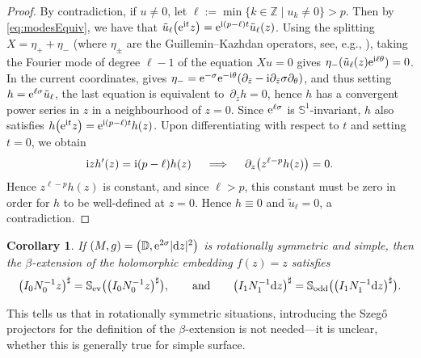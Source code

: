 \documentclass[10pt,a4paper]{amsart}
\numberwithin{equation}{section}
\newtheorem{Corollary}[Theorem]{Corollary}
\theoremstyle{definition}
\newcommand{\1}{{\bf 1}}
\newcommand \Dm { \mathbb{D}}
\newcommand \Sm { \mathbb{S}}
\newcommand \Zm { \mathbb{Z}}
\newcommand \zbar { \bar{z}}
\newcommand \tu {\tilde{u}}
\begin{document}
\begin{proof}By contradiction, if $u\ne 0$, let $\ell := \min\{k\in \Zm \mid u_k\ne 0\}>p$. Then by \eqref{eq:modesEquiv}, we have that $\tu_\ell \bigl({\rm e}^{{\rm i}t}z\bigr) = {\rm e}^{{\rm i}(p-\ell)t} \tu_\ell(z)$. {Using the splitting $X = \eta_+ + \eta_-$ (where $\eta_\pm$ are the Guillemin--Kazhdan operators, see, e.g., \cite[Definition~6.1.4]{PSU23}), taking the Fourier mode of degree $\ell-1$ of the equation $Xu =0$ gives $\eta_- (\tu_\ell (z) {\rm e}^{{\rm i}\ell \theta}) = 0$. In the current coordinates, \cite[Lemma~6.1.8]{PSU23} gives $\eta_- = {\rm e}^{-\sigma} {\rm e}^{-{\rm i}\theta} (\partial_{\bar{z}} - {\rm i}\partial_{\bar{z}}\sigma \partial_\theta)$, and thus setting $h = {\rm e}^{\ell\sigma} \tu_\ell$, the last equation is equivalent to~${\partial_{\zbar} h = 0}$}, hence $h$ has a convergent power series in $z$ in a neighbourhood of $z=0$. Since ${\rm e}^{\ell\sigma}$ is $\Sm^1$-invariant, $h$ also satisfies $h\bigl({\rm e}^{{\rm i}t}z\bigr) = {\rm e}^{{\rm i}(p-\ell)t} h(z)$. Upon differentiating with respect to $t$ and setting $t=0$, we obtain
	\begin{align*}
		{\rm i}z h'(z) ={\rm i} (p-\ell) h(z) \quad \implies \quad \partial_z \bigl(z^{\ell-p} h(z)\bigr) = 0.
	\end{align*}
	Hence $z^{\ell-p} h(z)$ is constant, and since $\ell>p$, this constant must be zero in order for $h$ to be well-defined at $z=0$. Hence $h\equiv 0$ and $\tu_\ell=0$, a contradiction.
\end{proof}

\begin{Corollary}\label{cor:noSzego} If $(M,g) = \bigl(\Dm,{\rm e}^{2\sigma}|{\rm d}z|^2\bigr)$ is rotationally symmetric and simple, then the $\beta$\nobreakdash-ex\-ten\-sion of the holomorphic embedding $f(z)=z$ satisfies
	\begin{align*}
		\bigl(I_0 N_0^{-1} z\bigr)^\sharp = \Sm_{\mathrm{ev}} \bigl(\bigl(I_0 N_0^{-1} z\bigr)^\sharp \bigr), \qquad \text{and}\qquad \bigl(I_1 N_1^{-1} {\rm d}z\bigr)^\sharp = \Sm_{\mathrm{odd}} \bigl(\bigl(I_1 N_1^{-1} {\rm d}z\bigr)^\sharp \bigr).
	\end{align*}
\end{Corollary}

This tells us that in rotationally symmetric situations, introducing the Szeg\H{o} projectors for the definition of the $\beta$-extension is not needed---it is unclear, whether this is generally true for simple surface.
\end{document}
